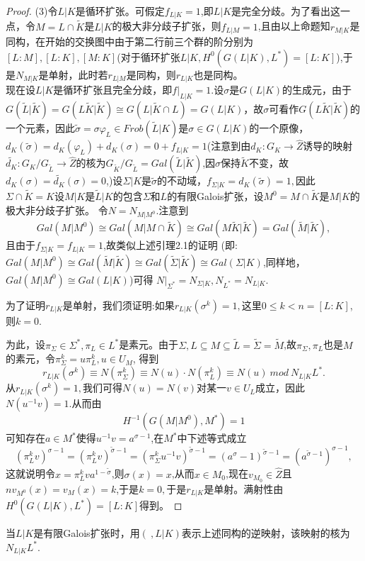 \documentclass[UTF8]{article}
\begin{document}
\begin{proof}
	(3)令$L|K$是循环扩张。可假定$f_{L|K}=1$,即$L|K$是完全分歧。为了看出这一点，令$M=L\cap \widetilde{K}$是$L|K$的极大非分歧子扩张，则$f_{L|M}=1$,且由以上命题知$r_{M|K}$是同构，在开始的交换图中由于第二行前三个群的阶分别为$[L:M],[L:K],[M:K]$(对于循环扩张$L|K,H^{0}(G(L|K),L^{*})=[L:K]$),于是$N_{M|K}$是单射，此时若$r_{L|M}$是同构，则$r_{L|K}$也是同构。\\
	
	现在设$L|K$是循环扩张且完全分歧，即$f|_{L|K}=1.$设$\sigma$是$G(L|K)$的生成元，由于$G(\widetilde{L}|\widetilde{K})=G(L\widetilde{K}|\widetilde{K})\cong G(L|\widetilde{K}\cap L)=G(L|K)$，故$\sigma$可看作$G(L\widetilde{K}|\widetilde{K})$的一个元素，因此$\tilde{\sigma}=\sigma\varphi_{L}\in Frob(\widetilde{L}|K)$是$\sigma\in G(L|K)$的一个原像，$d_{K}(\tilde{\sigma})=d_{K}(\varphi_{L})+d_{K}(\sigma)=0+f_{L|K}=1$(注意到由$d_{K}:G_{K}\rightarrow \widehat{Z}$诱导的映射$
	\widetilde{d_{K}}:G_{K}/G_{\widetilde{L}}\rightarrow \widehat{Z}$的核为$G_{\widetilde{K}}/G_{\widetilde{L}}=Gal(\widetilde{L}|\widetilde{K})$,因$\sigma$保持$\widetilde{K}$不变，故$d_{K}(\sigma)=\widetilde{d_{K}}(\sigma)= 0$,)设$\Sigma|K$是$\tilde{\sigma}$的不动域，$f_{\Sigma|K}=d_{K}(\tilde{\sigma})=1,$因此$\Sigma\cap \widetilde{K}=K$设$M|K$是$\widetilde{L}|K$的包含$\Sigma$和$L$的有限Galois扩张，设$M^{0}=M\cap \widetilde{K}$是$M|K$的极大非分歧子扩张。
	令$N=N_{M|M^{0}}$.注意到
	$$
	Gal(M|M^{0})\cong Gal(M|M\cap \widetilde{K})\cong Gal(M\widetilde{K}|\widetilde{K}) =Gal(\widetilde{M}|\widetilde{K}),
	$$
	且由于$f_{\Sigma|K}=f_{L|K}=1$,故类似上述引理2.1的证明
	(即:$Gal(M|M^{0})\cong Gal(\widetilde{M}|\widetilde{K})\cong Gal(\widetilde{\Sigma}|\widetilde{K})\cong Gal(\Sigma|K)$,同样地，$Gal(M|M^{0})\cong Gal(L|K)$)可得
	$N|_{\Sigma^{*}}=N_{\Sigma|K},N_{L^{*}}=N_{L|K}$.
	
	为了证明$r_{L|K}$是单射，我们须证明:如果$r_{L|K}(\sigma^{k})=1,$这里$0\leq k<n=[L:K]$,则$k=0$.
	
	为此，设$\pi_{\Sigma}\in \Sigma^{*},\pi_{L}\in L^{*}$是素元。由于$\Sigma,L\subseteq M\subseteq \widetilde{L}=\widetilde{\Sigma}=\widetilde{M}$,故$\pi_{\Sigma},\pi_{L}$也是$M$的素元，令$\pi_{\Sigma}^{k}=u\pi_{L}^{k},u\in U_{M}$,
	得到$$
	r_{L|K}(\sigma^{k})\equiv N(\pi^{k}_{\Sigma})\equiv
N(u)\cdot N(\pi_{L}^{k})\equiv N(u)\ mod \ N_{L|K}L^{*}.$$
从$r_{L|K}(\sigma^{k})=1,$我们可得$N(u)=N(v)$对某一$v\in U_{L}$成立，因此
$N(u^{-1}v)=1.$从而由
$$H^{-1}(G(M|M^{0}),M^{*})=1$$
可知存在$a\in M^{*}$使得$u^{-1}v=a^{\sigma-1}$,在$M^{*}$中下述等式成立
$$
(\pi_{L}^{k}v)^{\sigma-1}=(\pi_{L}^{k}v)^{\tilde{\sigma}-1}=(\pi_{\Sigma}^{k}u^{-1}v)^{\tilde{\sigma}-1}=(a^{\sigma}-1)^{\tilde{\sigma}-1}=(a^{\tilde{\sigma}-1})^{\sigma-1},
$$
这就说明令$x=\pi_{L}^{k}va^{1-\tilde{\sigma}}$,则$\sigma(x)=x$,从而$x\in M_{0}$,现在$v_{M_{0}}\in \widehat{Z}$且$nv_{M^{0}}(x)=v_{M}(x)=k$,于是$k=0,$于是$r_{L|K}$是单射。满射性由$H^{0}(G(L|K),L^{*})=[L:K]$得到。
	\end{proof}
当$L|K$是有限Galois扩张时，用$(\ ,L|K)$表示上述同构的逆映射，该映射的核为
$N_{L|K}L^{*}$.
\end{document}
